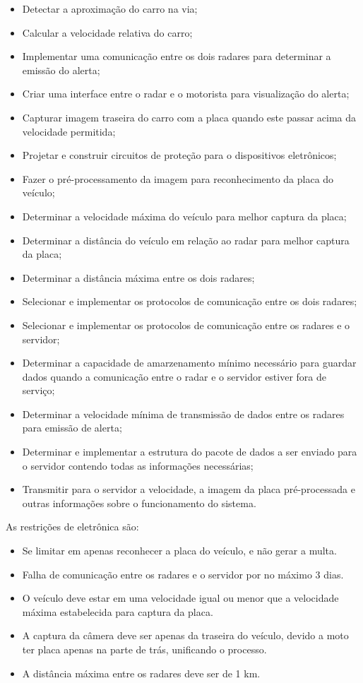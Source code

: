 \begin{itemize}
	\item Detectar a aproximação do carro na via;
    \item Calcular a velocidade relativa do carro;
    \item Implementar uma comunicação entre os dois radares para determinar a emissão do alerta;
    \item Criar uma interface entre o radar e o motorista para visualização do alerta;
    \item Capturar imagem traseira do carro com a placa quando este passar acima da velocidade permitida;
    \item Projetar e construir circuitos de proteção para o dispositivos eletrônicos;
    \item Fazer o pré-processamento da imagem para reconhecimento da placa do veículo;
    \item Determinar a velocidade máxima do veículo para melhor captura da placa;
    \item Determinar a distância do veículo em relação ao radar para melhor captura da placa;
    \item Determinar a distância máxima entre os dois radares;
    \item Selecionar e implementar os protocolos de comunicação entre os dois radares;
    \item Selecionar e implementar os protocolos de comunicação entre os radares e o servidor;
     \item Determinar a capacidade de amarzenamento mínimo necessário para guardar dados quando a comunicação entre o radar e o servidor estiver fora de serviço;
     \item Determinar a velocidade mínima de transmissão de dados entre os radares para emissão de alerta;
     \item Determinar e implementar a estrutura do pacote de dados a ser enviado para o servidor contendo todas as informações necessárias;
     \item Transmitir para o servidor a velocidade, a imagem da placa pré-processada  e outras informações sobre o funcionamento do sistema.
\end{itemize}    
    
    As restrições de eletrônica são:

\begin{itemize}

	\item Se limitar em apenas reconhecer a placa do veículo, e não gerar a multa.
	\item Falha de comunicação entre os radares e o servidor por no máximo 3 dias.
	\item O veículo deve estar em uma velocidade igual ou menor que a velocidade máxima estabelecida para captura da placa.
	\item A captura da câmera deve ser apenas da traseira do veículo, devido a moto ter placa apenas na parte de trás, unificando o processo.
	\item A distância máxima entre os radares deve ser de 1 km.
	
\end{itemize} 	
	

